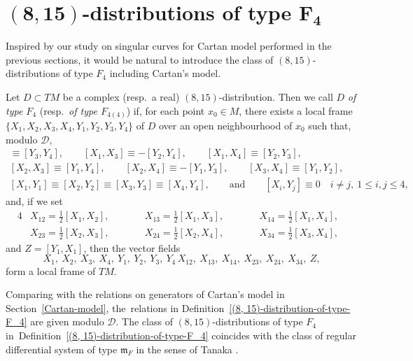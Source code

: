 \documentclass[11pt]{article}
\numberwithin{equation}{section}
\numberwithin{equation}{section}
\theoremstyle{definition}
\newcommand{\0}{\boldsymbol{0}}
\begin{document}
\section[(8,15)-distributions of type F\_4]{$\boldsymbol{(8,15)}$-distributions of type $\boldsymbol{F_4}$}
\label{$(8, 15)$-distributions of type $F_4$}

Inspired by our study on singular curves for Cartan model performed in the previous sections,
it would be natural to introduce the class of $(8, 15)$-distributions of type $F_4$ including Cartan's model.

\begin{Definition}
\label{(8, 15)-distribution-of-type-F_4}
Let $D \subset TM$ be a complex (resp.\ a real) $(8, 15)$-distribution.
Then we call $D$ {\it of type $F_4$} (resp.\ {\it of type $F_{4(4)}$})
if, for each point $x_0 \in M$, there exists a local frame $\{ X_1, X_2, X_3, X_4,
Y_1, Y_2, Y_3, Y_4\}$ of $D$ over an open neighbourhood of $x_0$ such that, modulo ${\mathcal D}$,
\begin{gather*}
[X_1, X_2] \equiv [Y_3, Y_4], \qquad [X_1, X_3] \equiv -[Y_2, Y_4], \qquad [X_1, X_4] \equiv [Y_2, Y_3],
\\
[X_2, X_3] \equiv [Y_1, Y_4], \qquad [X_2, X_4] \equiv -[Y_1, Y_3], \qquad [X_3, X_4] \equiv [Y_1, Y_2],
\\
[X_1, Y_1] \equiv [X_2, Y_2] \equiv [X_3, Y_3] \equiv [X_4, Y_4],
\qquad {\text{and}} \qquad [X_i, Y_j] \equiv 0 \quad i \not= j, \ 1 \leq i, j \leq 4,
\end{gather*}
and, if we set
\begin{alignat*}{4}
&X_{12} = \frac{1}{2}[X_1, X_2],\qquad&& X_{13} = \frac{1}{2}[X_1, X_3],\qquad&& X_{14} = \frac{1}{2}[X_1, X_4],&\\
&X_{23} = \frac{1}{2}[X_2, X_3],\qquad&& X_{24} = \frac{1}{2}[X_2, X_4],\qquad&& X_{34} = \frac{1}{2}[X_3, X_4],&
\end{alignat*}
and $Z = [Y_1, X_1]$,
then the vector fields
\[
X_1,\ X_2,\ X_3,\ X_4,\ Y_1,\ Y_2,\ Y_3,\ Y_4\, X_{12},\ X_{13},\ X_{14},\ X_{23},\ X_{24},\ X_{34},\ Z,
\]
form a local frame of $TM$.
\end{Definition}

\begin{Remark}
Comparing with the relations on generators of Cartan's model in Section~\ref{Cartan-model},
the~relations in Definition~\ref{(8, 15)-distribution-of-type-F_4} are given modulo ${\mathcal D}$.
The class of $(8, 15)$-distributions of type $F_4$ in~Definition~\ref{(8, 15)-distribution-of-type-F_4}
coincides with the class of regular differential system of type ${\mathfrak m}_F$ in the sense of
Tanaka \cite{Tanaka1, Tanaka2, Yamaguchi}.
\end{Remark}
\end{document}
